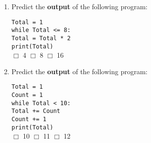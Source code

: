 \documentclass[11pt]{report}
\begin{document}
\begin{enumerate}
    \item Predict the \textbf{output} of the following program:

    {\tt Total = 1}\\
    {\tt while Total <= 8:}\\
    \indent \hspace{2em} {\tt  Total = Total * 2}\\
    {\tt print(Total)}\\
    $\Box$ 4 \hspace{3em} $\Box$ 8 \hspace{3em} $\Box$ 16

    \item Predict the \textbf{output} of the following program:

    {\tt Total = 1}\\
    {\tt Count = 1}\\
    {\tt while Total < 10:}\\
    \indent \hspace{4em} {\tt  Total += Count}\\
    \indent \hspace{4em} {\tt  Count += 1}\\
    {\tt print(Total)}\\
    $\Box$ 10 \hspace{3em} $\Box$ 11 \hspace{3em} $\Box$ 12

\end{enumerate}
\end{document}
